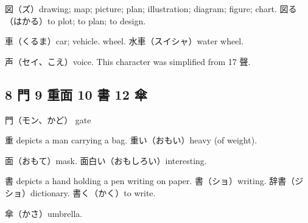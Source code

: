 図（ズ）drawing; map; picture; plan; illustration; diagram; figure; chart.
図る（はかる）to plot; to plan; to design.

車（くるま）car; vehicle. wheel.
水車（スイシャ）water wheel.

声（セイ、こえ）voice.
This character was simplified from 17 聲.

\subsection{8 門 9 重面 10 書 12 傘}

門（モン、かど） gate

重 depicts a man carrying a bag.
重い（おもい）heavy (of weight).

面（おもて）mask.
面白い（おもしろい）interesting.

書 depicts a hand holding a pen writing on paper.
書（ショ）writing.
辞書（ジショ）dictionary.
書く（かく）to write.

傘（かさ）umbrella.
